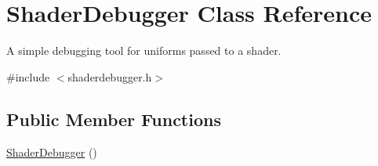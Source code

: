 \hypertarget{class_shader_debugger}{}\section{Shader\+Debugger Class Reference}
\label{class_shader_debugger}


A simple debugging tool for uniforms passed to a shader.  




{\ttfamily \#include $<$shaderdebugger.\+h$>$}

\subsection*{Public Member Functions}
\begin{DoxyCompactItemize}
\item 
\mbox{\hyperlink{class_shader_debugger_a3c8f54bb5e86871315d8d398569a3dd6}{Shader\+Debugger}} ()
\end{DoxyCompactItemize}
